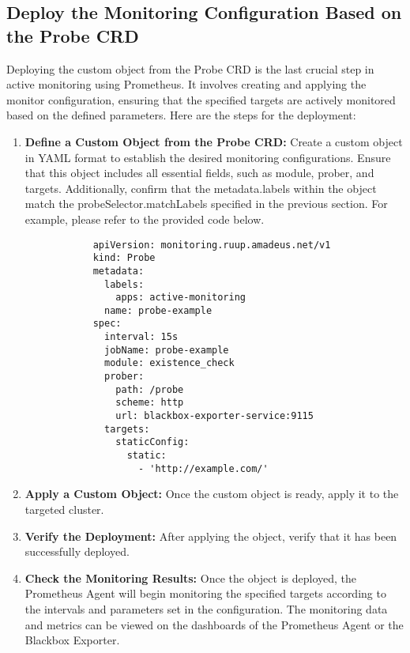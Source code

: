 \subsection{Deploy the Monitoring Configuration Based on the Probe \ac{CRD}}

Deploying the custom object from the Probe \ac{CRD} is the last crucial step in active monitoring using Prometheus. It involves creating and applying the monitor configuration, ensuring that the specified targets are actively monitored based on the defined parameters. Here are the steps for the deployment:

\begin{enumerate}
    \item \textbf{Define a Custom Object from the Probe \ac{CRD}:}
    Create a custom object in YAML format to establish the desired monitoring configurations. Ensure that this object includes all essential fields, such as module, prober, and targets. Additionally, confirm that the metadata.labels within the object match the probeSelector.matchLabels specified in the previous section. For example, please refer to the provided code below. 
        \begin{lstlisting}
            apiVersion: monitoring.ruup.amadeus.net/v1
            kind: Probe
            metadata:
              labels:
                apps: active-monitoring
              name: probe-example
            spec:
              interval: 15s
              jobName: probe-example
              module: existence_check
              prober:
                path: /probe
                scheme: http
                url: blackbox-exporter-service:9115
              targets:
                staticConfig:
                  static:
                    - 'http://example.com/'
        \end{lstlisting}
    \item \textbf{Apply a Custom Object:}
    Once the custom object is ready, apply it to the targeted cluster. 
    \item \textbf{Verify the Deployment:}
    After applying the object, verify that it has been successfully deployed. 
    \item \textbf{Check the Monitoring Results:}
    Once the object is deployed, the Prometheus Agent will begin monitoring the specified targets according to the intervals and parameters set in the configuration. The monitoring data and metrics can be viewed on the dashboards of the Prometheus Agent or the Blackbox Exporter. 
\end{enumerate}

